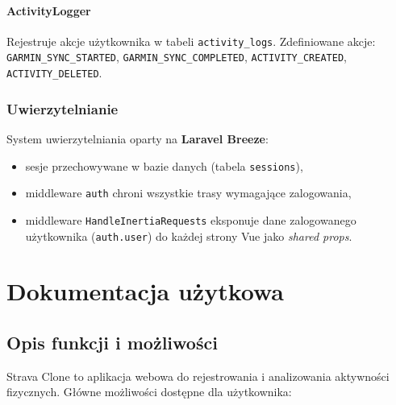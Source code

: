 \documentclass[12pt,a4paper]{report}
\begin{document}
\subsubsection{ActivityLogger}

Rejestruje akcje użytkownika w tabeli \texttt{activity\_logs}. Zdefiniowane akcje:
\texttt{GARMIN\_SYNC\_STARTED}, \texttt{GARMIN\_SYNC\_COMPLETED}, \texttt{ACTIVITY\_CREATED}, \texttt{ACTIVITY\_DELETED}.

\subsection{Uwierzytelnianie}

System uwierzytelniania oparty na \textbf{Laravel Breeze}:
\begin{itemize}[noitemsep]
    \item sesje przechowywane w bazie danych (tabela \texttt{sessions}),
    \item middleware \texttt{auth} chroni wszystkie trasy wymagające zalogowania,
    \item middleware \texttt{HandleInertiaRequests} eksponuje dane zalogowanego użytkownika (\texttt{auth.user}) do każdej strony Vue jako \textit{shared props}.
\end{itemize}


\chapter{Dokumentacja użytkowa}
\label{ch:uzytkownik}

\section{Opis funkcji i możliwości}

Strava Clone to aplikacja webowa do rejestrowania i analizowania aktywności fizycznych. Główne możliwości dostępne dla użytkownika:
\end{document}
